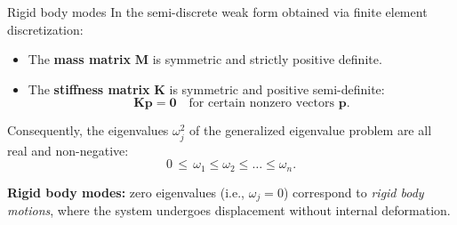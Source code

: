 \documentclass[aspectratio=169]{beamer}
\begin{document}
{
\color{white}
\begin{frame}{Rigid body modes}
  \small In the semi-discrete weak form obtained via finite element discretization:
  \begin{itemize}
    \item The \textbf{mass matrix} \( \mathbf{M} \) is symmetric and strictly positive definite.
    \item The \textbf{stiffness matrix} \( \mathbf{K} \) is symmetric and positive semi-definite:
          \[
            \mathbf{K} \mathbf{p} = \mathbf{0} \quad \text{for certain nonzero vectors } \mathbf{p}.
          \]
  \end{itemize}
  Consequently, the eigenvalues \( \omega_j^2 \) of the generalized eigenvalue problem are all real and non-negative:
  \[
    0 \,\leq\, \omega_1 \leq \omega_2 \leq \dots \leq \omega_n.
  \]

  \vspace{0.2cm}
  \begin{tcolorbox}[colback=darkred!10,colframe=darkred!40!black]
    \textbf{Rigid body modes:} zero eigenvalues (i.e., \( \omega_j = 0 \)) correspond to \emph{rigid body motions}, where the system undergoes displacement without internal deformation.
  \end{tcolorbox}
\end{frame}
}
\end{document}
